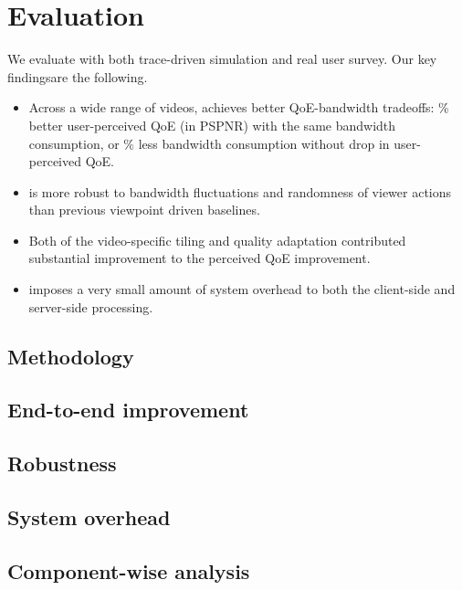 
\section{Evaluation}
\label{sec:eval}

We evaluate \name with both trace-driven simulation and real user survey. 
Our key findingsare the following.

\begin{itemize}

\item Across a wide range of videos, \name achieves better QoE-bandwidth tradeoffs: \fillme\% better user-perceived QoE (in PSPNR) with the same bandwidth consumption, or \fillme\% less bandwidth consumption without drop in user-perceived QoE.

\item \name is more robust to bandwidth fluctuations and randomness of viewer actions than previous viewpoint driven baselines.

\item Both of the \vr video-specific tiling and quality adaptation contributed substantial improvement to the perceived QoE improvement.

\item \name imposes a very small amount of system overhead to both the client-side and server-side processing.

\end{itemize}

\subsection{Methodology}





\subsection{End-to-end improvement}




\subsection{Robustness}




\subsection{System overhead}




\subsection{Component-wise analysis}


